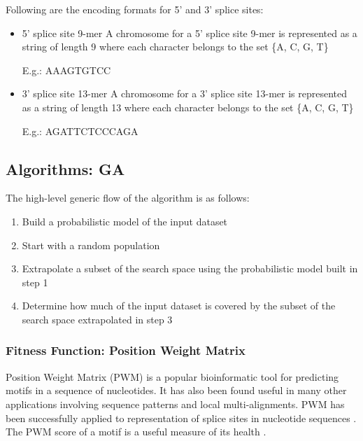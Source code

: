 \documentclass[12pt,a4paper]{article}
\begin{document}
	Following are the encoding formats for 5' and 3' splice sites:
	\begin{itemize}
	\item 5' splice site 9-mer
	A chromosome for a 5’ splice site 9-mer is represented as a string of length 9 where each character belongs to the set \{A, C, G, T\} \par
	E.g.: AAAGTGTCC
	
	\item 3' splice site 13-mer
	A chromosome for a 3’ splice site 13-mer is represented as a string of length 13 where each character belongs to the set \{A, C, G, T\} \par
	E.g.: AGATTCTCCCAGA
	\end{itemize}
	

	\subsection{Algorithms: GA} \label{sec:algoGA}
	
	The high-level generic flow of the algorithm is as follows:
	\begin{enumerate}
		\item Build a probabilistic model of the input dataset
		\item Start with a random population
		\item Extrapolate a subset of the search space using the probabilistic model built in step 1
		\item Determine how much of the input dataset is covered by the subset of the search space extrapolated in step 3
	\end{enumerate}

	\subsubsection{Fitness Function: Position Weight Matrix} \label{sec-pwm}
	Position Weight Matrix (PWM) is a popular bioinformatic tool for predicting motifs in a sequence of nucleotides. It has also been found useful in many other applications involving sequence patterns and local multi-alignments. PWM has been successfully applied to representation of splice sites in nucleotide sequences \cite{pwm-2}. The PWM score of a motif is a useful measure of its health \cite{pwm-1}. \par
	
\end{document}

